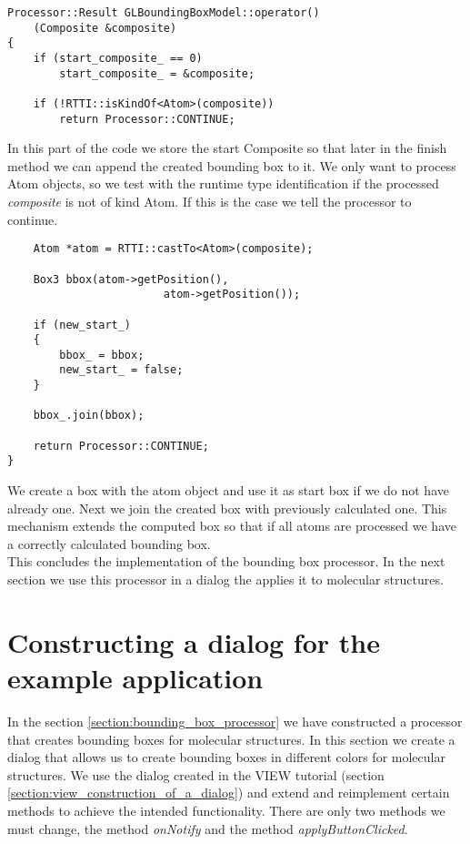 \begin{verbatim}
Processor::Result GLBoundingBoxModel::operator() 
	(Composite &composite)
{
	if (start_composite_ == 0)
		start_composite_ = &composite;

	if (!RTTI::isKindOf<Atom>(composite))
		return Processor::CONTINUE;
\end{verbatim}

In this part of the code we store the start Composite so that later in the finish
method we can append the created bounding box to it.
We only want to process Atom objects, so we test with the runtime type
identification if the processed {\em composite} is not of kind Atom. If this
is the case we tell the processor to continue.

\begin{verbatim}
	Atom *atom = RTTI::castTo<Atom>(composite);

	Box3 bbox(atom->getPosition(), 
						atom->getPosition());

	if (new_start_)
	{
		bbox_ = bbox;
		new_start_ = false;
	}

	bbox_.join(bbox);

	return Processor::CONTINUE;
}
\end{verbatim}

We create a box with the atom object and use it as start box if we do not have already
one. Next we join the created box with previously calculated one. This mechanism
extends the computed box so that if all atoms are processed we have a correctly calculated
bounding box.\\

This concludes the implementation of the bounding box processor. In the next
section we use this processor in a dialog the applies it to molecular structures.



\section{Constructing a dialog for the example application}
\label{section:construction_of_a_dialog}

In the section \ref{section:bounding_box_processor} we have constructed a processor that creates bounding boxes
for molecular structures. In this section we create a dialog that allows us to
create bounding boxes in different colors for molecular structures. We use the dialog
created in the VIEW tutorial (section \ref{section:view_construction_of_a_dialog}) and extend and 
reimplement certain methods to achieve the intended functionality.
There are only two methods we must change, the method {\em onNotify} and the method
{\em applyButtonClicked}.

